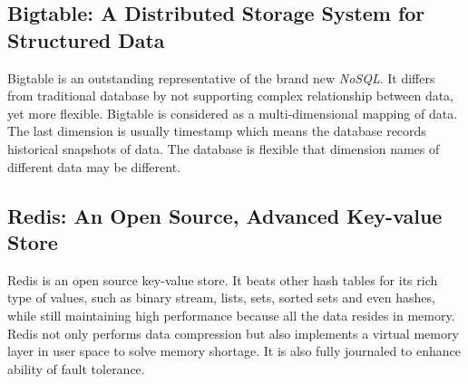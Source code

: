 \documentclass{article}
\begin{document}
\subsection{Bigtable: A Distributed Storage System for Structured Data}
Bigtable\cite{chang2008bigtable} is an outstanding representative of the brand
new \emph{NoSQL}. It differs from traditional database by not supporting
complex relationship between data, yet more flexible. Bigtable is considered
as a multi-dimensional mapping of data. The last dimension is usually
timestamp which means the database records historical snapshots of data. The
database is flexible that dimension names of different data may be different.

\subsection{Redis: An Open Source, Advanced Key-value Store}
Redis\cite{redis} is an open source key-value store. It beats other hash
tables for its rich type of values, such as binary stream, lists, sets, sorted
sets and even hashes, while still maintaining high performance because all the
data resides in memory. Redis not only performs data compression but also
implements a virtual memory layer in user space to solve memory shortage. It
is also fully journaled to enhance ability of fault tolerance.



\end{document}
